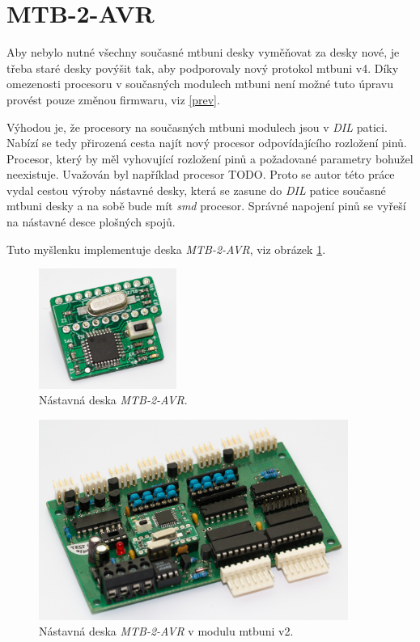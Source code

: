 \section{MTB-2-AVR}

Aby nebylo nutné všechny současné \gls{mtbuni} desky vyměňovat za desky nové,
je třeba staré desky povýšit tak, aby podporovaly nový protokol \gls{mtbuni} v4.
Díky omezenosti procesoru v současných modulech \gls{mtbuni} není možné tuto
úpravu provést pouze změnou firmwaru, viz \ref{prev}.

Výhodou je, že procesory na současných \gls{mtbuni} modulech jsou v
\textit{DIL} patici. Nabízí se tedy přirozená cesta najít nový procesor
odpovídajícího rozložení pinů. Procesor, který by měl vyhovující rozložení pinů
a požadované parametry bohužel neexistuje. Uvažován byl například procesor
TODO. Proto se autor této práce vydal cestou výroby nástavné desky, která se
zasune do \textit{DIL} patice současné \gls{mtbuni} desky a na sobě bude mít
\textit{smd} procesor.  Správné napojení pinů se vyřeší na nástavné desce
plošných spojů.

Tuto myšlenku implementuje deska \textit{MTB-2-AVR}, viz obrázek
\ref{fig:mtb-2-avr-alone}.

\begin{figure}[ht]
\includegraphics[width=0.4\textwidth]{data/uni-2-upgrade-alone.jpg}
\caption{Nástavná deska \textit{MTB-2-AVR}.}
\label{fig:mtb-2-avr-alone}
\end{figure}

\begin{figure}[ht]
\includegraphics[width=0.9\textwidth]{data/uni-2-upgrade-all.jpg}
\caption{Nástavná deska \textit{MTB-2-AVR} v modulu \gls{mtbuni} v2.}
\label{fig:mtb-2-avr-inside}
\end{figure}

